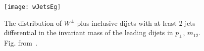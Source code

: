 		\begin{figure}[hbt]
			\centering
			\texttt{[image: wJetsEg]}
			\caption{The distribution of $W^\pm$ plus inclusive dijets with at least
			2 jets differential in the invariant mass of the leading dijets in $p_\perp$, $m_{12}$.
			Fig. from~\cite{Aad:2014qxa}.}
			\label{fig:wJetsEg}
		\end{figure}

